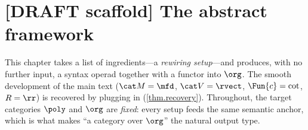 %
%

\providecommand{\rwd}{\Fun{rWD}}     %
\providecommand{\Data}{\Cat{Data}}   %
\providecommand{\SMC}{\Cat{SMC}}     %

\chapter{[DRAFT scaffold] The abstract framework}\label{ch.framework_DRAFT}

This chapter takes a list of ingredients---a \emph{rewiring setup}---and
produces, with no further input, a syntax operad together with a functor into
$\org$. The smooth development of the main text ($\cat M=\mfd$, $\cat V=\rvect$,
$\Fun{c}=\cot$, $R=\rr$) is recovered by plugging in (\cref{thm.recovery}).
Throughout, the target categories $\poly$ and $\org$ are \emph{fixed}: every
setup feeds the same semantic anchor, which is what makes ``a category over
$\org$'' the natural output type.

